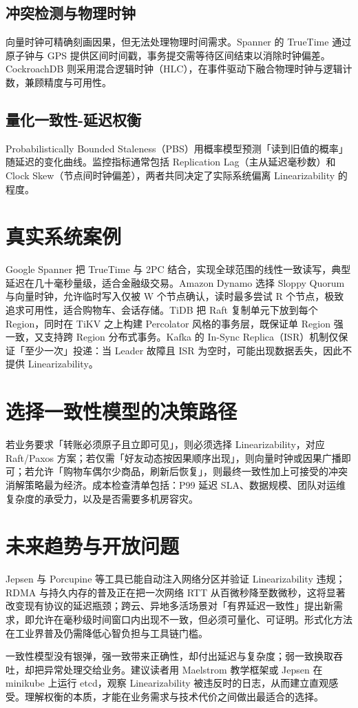 \section{冲突检测与物理时钟}
向量时钟可精确刻画因果，但无法处理物理时间需求。Spanner 的 TrueTime 通过原子钟与 GPS 提供区间时间戳，事务提交需等待区间结束以消除时钟偏差。CockroachDB 则采用混合逻辑时钟（HLC），在事件驱动下融合物理时钟与逻辑计数，兼顾精度与可用性。\par
\section{量化一致性-延迟权衡}
Probabilistically Bounded Staleness（PBS）用概率模型预测「读到旧值的概率」随延迟的变化曲线。监控指标通常包括 Replication Lag（主从延迟毫秒数）和 Clock Skew（节点间时钟偏差），两者共同决定了实际系统偏离 Linearizability 的程度。\par
\chapter{真实系统案例}
Google Spanner 把 TrueTime 与 2PC 结合，实现全球范围的线性一致读写，典型延迟在几十毫秒量级，适合金融级交易。Amazon Dynamo 选择 Sloppy Quorum 与向量时钟，允许临时写入仅被 W 个节点确认，读时最多尝试 R 个节点，极致追求可用性，适合购物车、会话存储。TiDB 把 Raft 复制单元下放到每个 Region，同时在 TiKV 之上构建 Percolator 风格的事务层，既保证单 Region 强一致，又支持跨 Region 分布式事务。Kafka 的 In-Sync Replica（ISR）机制仅保证「至少一次」投递：当 Leader 故障且 ISR 为空时，可能出现数据丢失，因此不提供 Linearizability。\par
\chapter{选择一致性模型的决策路径}
若业务要求「转账必须原子且立即可见」，则必须选择 Linearizability，对应 Raft/Paxos 方案；若仅需「好友动态按因果顺序出现」，则向量时钟或因果广播即可；若允许「购物车偶尔少商品，刷新后恢复」，则最终一致性加上可接受的冲突消解策略最为经济。成本检查清单包括：P99 延迟 SLA、数据规模、团队对运维复杂度的承受力，以及是否需要多机房容灾。\par
\chapter{未来趋势与开放问题}
Jepsen 与 Porcupine 等工具已能自动注入网络分区并验证 Linearizability 违规；RDMA 与持久内存的普及正在把一次网络 RTT 从百微秒降至数微秒，这将显著改变现有协议的延迟瓶颈；跨云、异地多活场景对「有界延迟一致性」提出新需求，即允许在毫秒级时间窗口内出现不一致，但必须可量化、可证明。形式化方法在工业界普及仍需降低心智负担与工具链门槛。\par
一致性模型没有银弹，强一致带来正确性，却付出延迟与复杂度；弱一致换取吞吐，却把异常处理交给业务。建议读者用 Maelstrom 教学框架或 Jepsen 在 minikube 上运行 etcd，观察 Linearizability 被违反时的日志，从而建立直观感受。理解权衡的本质，才能在业务需求与技术代价之间做出最适合的选择。\par
